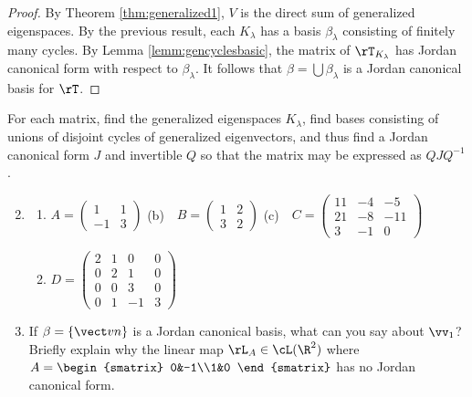 \begin{proof}
By Theorem \ref{thm:generalized1}, $V$ is the direct sum of generalized eigenspaces. By the previous result, each $K_\lambda$ has a basis $\beta_\lambda$ consisting of finitely many cycles. By Lemma \ref{lemm:gencyclesbasic}, the matrix of $\rT_{K_\lambda}$ has Jordan canonical form with respect to $\beta_\lambda$. It follows that $\beta=\bigcup\beta_\lambda$ is a Jordan canonical basis for $\rT$.
\end{proof}

\goodbreak

\begin{exercises}
\exstart For each matrix, find the generalized eigenspaces $K_\lambda$, find bases consisting of unions of disjoint cycles of generalized eigenvectors, and thus find a Jordan canonical form $J$ and invertible $Q$ so that the matrix may be expressed as $QJQ^{-1}$.
\begin{enumerate}\setcounter{enumi}{1}
  \item[]\begin{enumerate}
    \item $A=\begin{pmatrix}
    1&1\\-1&3
    \end{pmatrix}$
    \qquad
    (b)\ \ $B=\begin{pmatrix}
    1&2\\3&2
    \end{pmatrix}$
		\qquad
    (c)\ \ $C=\begin{pmatrix}
    11&-4&-5\\21&-8&-11\\3&-1&0
    \end{pmatrix}$
    \item[(d)] $D=\begin{pmatrix}
    2&1&0&0\\0&2&1&0\\0&0&3&0\\0&1&-1&3
    \end{pmatrix}$
	\end{enumerate}
	
	\item If $\beta=\{\vect vn\}$ is a Jordan canonical basis, what can you say about $\vv_1$? Briefly explain why the linear map $\rL_A\in\cL(\R^2)$ where $A=\begin{smatrix}
	0&-1\\1&0
	\end{smatrix}$ has no Jordan canonical form.
	

\end{enumerate}
\end{exercises}

